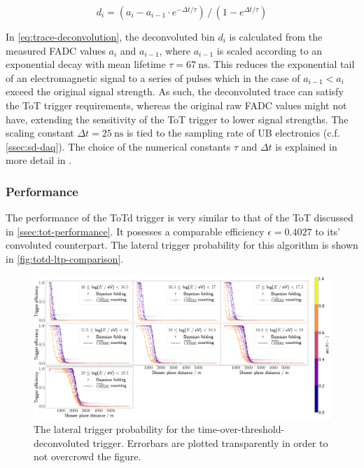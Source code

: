 \begin{equation}
    \label{eq:trace-deconvolution}
    d_i = (a_i - a_{i-1}\cdot e^{-\Delta t/\tau})\,/\,(1 - e^{\Delta t/\tau}) 
\end{equation}

In \autoref{eq:trace-deconvolution}, the deconvoluted bin $d_i$ is calculated from the measured FADC values $a_i$ and $a_{i-1}$, where $a_{i-1}$ is scaled 
according to an exponential decay with mean lifetime $\tau = \SI{67}{\nano\second}$. This reduces the exponential tail of an electromagnetic signal to a 
series of pulses which in the case of $a_{i-1} < a_i$ exceed the original signal strength. As such, the deconvoluted trace can satisfy the ToT trigger 
requirements, whereas the original raw FADC values might not have, extending the sensitivity of the ToT trigger to lower signal strengths. The scaling constant 
$\Delta t = \SI{25}{\nano\second}$ is tied to the sampling rate of UB electronics (c.f. \autoref{ssec:sd-daq}). The choice of the numerical constants $\tau$ and 
$\Delta t$ is explained in more detail in \cite{ToTtriggerIdea}.

\subsubsection{Performance}
\label{ssec:totd-performance}

The performance of the ToTd trigger is very similar to that of the ToT discussed in \autoref{ssec:tot-performance}. It posesses a comparable efficiency
$\epsilon = 0.4027$ to its' convoluted counterpart. The lateral trigger probability for this algorithm is shown in \autoref{fig:totd-ltp-comparison}.

\begin{figure}
	\centering
	\includegraphics[width=\textwidth]{./plots/totd_LTP_comparison.png}
	\caption{The lateral trigger probability for the time-over-threshold-deconvoluted trigger. Errorbars are plotted transparently in order to not overcrowd the 
	figure.} 
	\label{fig:totd-ltp-comparison}
\end{figure}

